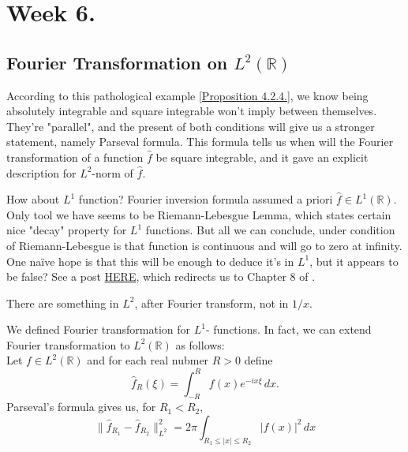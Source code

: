 \section{Week 6.}

\subsection{Fourier Transformation on $L^2(\mathbb R)$}

According to this pathological example \ref{Proposition 4.2.4.}, we know being absolutely integrable and square integrable won't imply between themselves. They're "parallel", and the present of both conditions will give us a stronger statement, namely Parseval formula. This formula tells us when will the Fourier transformation of a function $\hat{f}$ be square integrable, and it gave an explicit description for $L^2$-norm of $\hat{f}$.

\begin{Question}
    How about $L^1$ function? Fourier inversion formula assumed a priori $\hat{f}\in L^1(\mathbb R)$. 
    Only tool we have seems to be Riemann-Lebesgue Lemma, which states certain nice "decay" property for $L^1$ functions. But all we can conclude, under condition of Riemann-Lebesgue is that function is continuous and will go to zero at infinity. One na\"ive hope is that this will be enough to deduce it's in $L^1$, but it appears to be false? See a post \href{https://math.stackexchange.com/questions/465509/conditions-for-the-fourier-transform-of-an-l1-function-to-be-in-l1}{HERE}, which redirects us to Chapter 8 of \cite{folland1999real}.
\end{Question}

\begin{Example}
    There are something in $L^2$, after Fourier transform, not in $1/x$.
\end{Example}

We defined Fourier transformation for $L^1$- functions. In fact, we can extend Fourier transformation to $L^2(\mathbb R)$ as follows:\\

Let $f\in L^2(\mathbb R)$ and for each real nubmer $R>0$ define 
\[\hat{f}_R(\xi) = \int_{-R}^R f(x)e^{-ix\xi} \,dx.\]
Parseval's formula gives us, for $R_1< R_2$, 
\begin{equation}\label{Eq 4.34}
    \lVert \hat{f}_{R_1}-\hat{f}_{R_2}\rVert^2_{L^2}=2\pi \int_{R_1\leq \vert x\vert \leq R_2} \vert f(x)\vert^2 \,dx
\end{equation}

